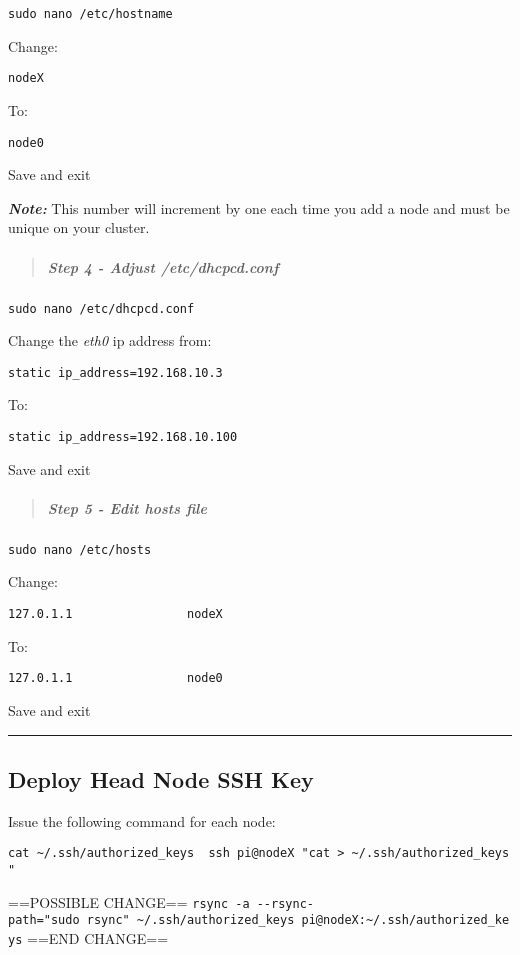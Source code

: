 \documentclass[]{article}
\let\oldsubparagraph\subparagraph
\renewcommand{\subparagraph}[1]{\oldsubparagraph{#1}\mbox{}}
\begin{document}
\texttt{sudo\ nano\ /etc/hostname}

Change:

\texttt{nodeX}

To:

\texttt{node0}

Save and exit

\emph{\textbf{Note:}} This number will increment by one each time you
add a node and must be unique on your cluster.

\begin{quote}
\mbox{}%
\subparagraph{\texorpdfstring{Step 4 - Adjust
\emph{/etc/dhcpcd.conf}}{Step 4 - Adjust /etc/dhcpcd.conf}}\label{step-4---adjust-etcdhcpcd.conf}
\end{quote}

\texttt{sudo\ nano\ /etc/dhcpcd.conf}

Change the \emph{eth0} ip address from:

\texttt{static\ ip\_address=192.168.10.3}

To:

\texttt{static\ ip\_address=192.168.10.100}

Save and exit

\begin{quote}
\mbox{}%
\subparagraph{Step 5 - Edit hosts file}\label{step-5---edit-hosts-file}
\end{quote}

\texttt{sudo\ nano\ /etc/hosts}

Change:

\texttt{127.0.1.1\ \ \ \ \ \ \ \ \ \ \ \ \ \ \ \ nodeX}

To:

\texttt{127.0.1.1\ \ \ \ \ \ \ \ \ \ \ \ \ \ \ \ node0}

Save and exit

\begin{center}\rule{0.5\linewidth}{\linethickness}\end{center}

\subsection{Deploy Head Node SSH Key}\label{deploy-head-node-ssh-key}

Issue the following command for each node:

\texttt{cat\ \textasciitilde{}/.ssh/authorized\_keys\ \textbar{}\ ssh\ pi@nodeX\ "cat\ \textgreater{}\ \textasciitilde{}/.ssh/authorized\_keys"}

==POSSIBLE CHANGE==
\texttt{rsync\ -a\ -\/-rsync-path="sudo\ rsync"\ \textasciitilde{}/.ssh/authorized\_keys\ pi@nodeX:\textasciitilde{}/.ssh/authorized\_keys}
==END CHANGE==
\end{document}
